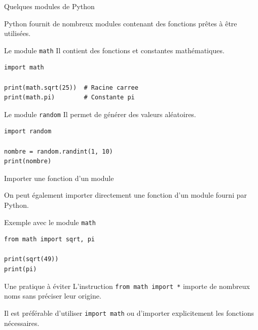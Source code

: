 \documentclass[10pt]{beamer}
\begin{document}
\begin{frame}[fragile]{Quelques modules de Python}

Python fournit de nombreux modules contenant des fonctions
prêtes à être utilisées.

\begin{block}{Le module \texttt{math}}
\small
Il contient des fonctions et constantes mathématiques.
\begin{lstlisting}
import math

print(math.sqrt(25))  # Racine carree
print(math.pi)        # Constante pi
\end{lstlisting}
\end{block}

\begin{block}{Le module \texttt{random}}
\small
Il permet de générer des valeurs aléatoires.
\begin{lstlisting}
import random

nombre = random.randint(1, 10)
print(nombre)
\end{lstlisting}
\end{block}

\end{frame}
\begin{frame}[fragile]{Importer une fonction d'un module}

On peut également importer directement une fonction
d'un module fourni par Python.

\begin{exampleblock}{Exemple avec le module \texttt{math}}
\small
\begin{lstlisting}
from math import sqrt, pi

print(sqrt(49))
print(pi)
\end{lstlisting}
\end{exampleblock}

\begin{alertblock}{Une pratique à éviter}
\small
L'instruction \texttt{from math import *} importe de nombreux
noms sans préciser leur origine.

Il est préférable d'utiliser \texttt{import math}
ou d'importer explicitement les fonctions nécessaires.
\end{alertblock}

\end{frame}
\end{document}
